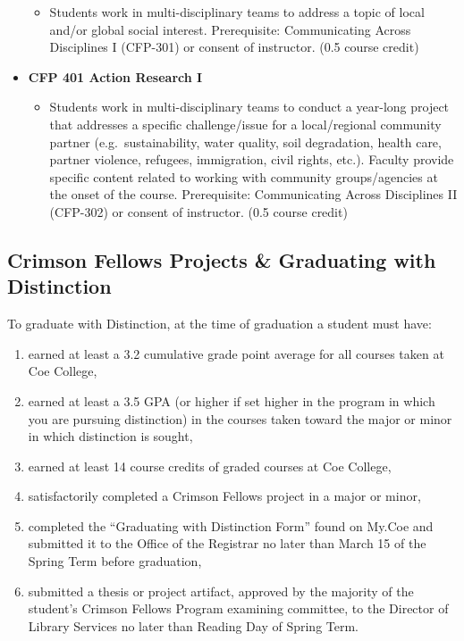 \documentclass[
  letterpaper,
]{scrbook}
\providecommand{\tightlist}{%
  \setlength{\itemsep}{0pt}\setlength{\parskip}{0pt}}
\begin{document}
\begin{itemize}
  \begin{itemize}
  \tightlist
  \item
    Students work in multi-disciplinary teams to address a topic of
    local and/or global social interest. Prerequisite: Communicating
    Across Disciplines I (CFP-301) or consent of instructor. (0.5 course
    credit)
  \end{itemize}
\item
  \textbf{CFP 401 Action Research I}

  \begin{itemize}
  \tightlist
  \item
    Students work in multi-disciplinary teams to conduct a year-long
    project that addresses a specific challenge/issue for a
    local/regional community partner (e.g.~sustainability, water
    quality, soil degradation, health care, partner violence, refugees,
    immigration, civil rights, etc.). Faculty provide specific content
    related to working with community groups/agencies at the onset of
    the course. Prerequisite: Communicating Across Disciplines II
    (CFP-302) or consent of instructor. (0.5 course credit)
  \end{itemize}
\end{itemize}

\subsection{Crimson Fellows Projects \& Graduating with
Distinction}\label{crimson-fellows-projects-graduating-with-distinction}

To graduate with Distinction, at the time of graduation a student must
have:

\begin{enumerate}
\def\labelenumi{\arabic{enumi}.}
\tightlist
\item
  earned at least a 3.2 cumulative grade point average for all courses
  taken at Coe College,
\item
  earned at least a 3.5 GPA (or higher if set higher in the program in
  which you are pursuing distinction) in the courses taken toward the
  major or minor in which distinction is sought,
\item
  earned at least 14 course credits of graded courses at Coe College,
\item
  satisfactorily completed a Crimson Fellows project in a major or
  minor,
\item
  completed the ``Graduating with Distinction Form'' found on My.Coe and
  submitted it to the Office of the Registrar no later than March 15 of
  the Spring Term before graduation,
\item
  submitted a thesis or project artifact, approved by the majority of
  the student's Crimson Fellows Program examining committee, to the
  Director of Library Services no later than Reading Day of Spring Term.
\end{enumerate}
\end{document}
